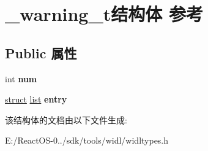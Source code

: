 \hypertarget{struct__warning__t}{}\section{\+\_\+warning\+\_\+t结构体 参考}
\label{struct__warning__t}
\subsection*{Public 属性}
\begin{DoxyCompactItemize}
\item 
\mbox{\label{struct__warning__t_a0148cf74ab2884bc9a4ad149b352682e}} 
int {\bfseries num}
\item 
\mbox{\label{struct__warning__t_ac6d2d60a38dab2f56ad45b0cf3c5f1e3}} 
\hyperlink{interfacestruct}{struct} \hyperlink{classlist}{list} {\bfseries entry}
\end{DoxyCompactItemize}


该结构体的文档由以下文件生成\+:\begin{DoxyCompactItemize}
\item 
E\+:/\+React\+O\+S-\/0../sdk/tools/widl/widltypes.\+h\end{DoxyCompactItemize}
